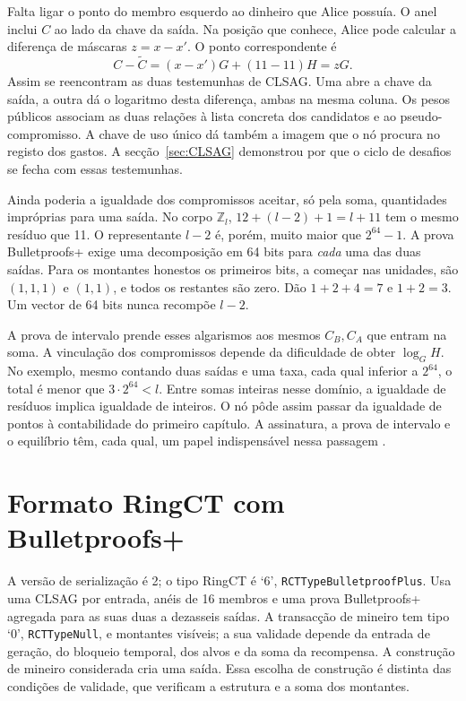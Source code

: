 Falta ligar o ponto do membro esquerdo ao dinheiro que Alice possuía.
O anel inclui \(C\) ao lado da chave da saída. Na posição que conhece,
Alice pode calcular a diferença de máscaras \(z=x-x'\). O ponto
correspondente é
\[
                 C-\widetilde C=(x-x')G+(11-11)H=zG.
\]
Assim se reencontram as duas testemunhas de CLSAG. Uma abre a chave
da saída, a outra dá o logaritmo desta diferença, ambas na mesma
coluna. Os pesos públicos associam as duas relações à lista concreta
dos candidatos e ao pseudo-compromisso. A chave de uso único dá
também a imagem que o nó procura no registo dos gastos. A
secção~\ref{sec:CLSAG} demonstrou por que o ciclo de desafios se
fecha com essas testemunhas.

Ainda poderia a igualdade dos compromissos aceitar, só pela soma,
quantidades impróprias para uma saída. No corpo \(\mathbb Z_l\),
\(12+(l-2)+1=l+11\) tem o mesmo resíduo que 11. O representante
\(l-2\) é, porém, muito maior que \(2^{64}-1\). A prova Bulletproofs+
exige uma decomposição em 64 bits para \emph{cada} uma das duas
saídas. Para os montantes honestos os primeiros bits, a começar nas
unidades, são \((1,1,1)\) e \((1,1)\), e todos os restantes são zero.
Dão \(1+2+4=7\) e \(1+2=3\). Um vector de 64 bits nunca recompõe
\(l-2\).

A prova de intervalo prende esses algarismos aos mesmos \(C_B,C_A\)
que entram na soma. A vinculação dos compromissos depende da
dificuldade de obter \(\log_G H\). No exemplo, mesmo contando duas
saídas e uma taxa, cada qual inferior a \(2^{64}\), o total é menor
que \(3\cdot2^{64}<l\). Entre somas inteiras nesse domínio, a
igualdade de resíduos implica igualdade de inteiros. O nó pôde assim
passar da igualdade de pontos à contabilidade do primeiro capítulo.
A assinatura, a prova de intervalo e o equilíbrio têm, cada qual,
um papel indispensável nessa passagem
\cite{MRL-0011-CLSAG,bulletproofs-plus-paper,monero-source-v16}.

\section{Formato RingCT com Bulletproofs+}
\label{sec:RCTTypeBulletproofPlus}

A versão de serialização é 2; o tipo RingCT é `6',
\texttt{RCTType}\allowbreak\texttt{BulletproofPlus}. Usa uma CLSAG por entrada, anéis de 16
membros e uma prova Bulletproofs+ agregada para as suas duas a dezasseis
saídas. A transacção de mineiro tem tipo `0', \texttt{RCTTypeNull}, e
montantes visíveis; a sua validade depende da entrada de geração, do
bloqueio temporal, dos alvos e da soma da recompensa. A construção de
mineiro considerada cria uma saída. Essa escolha de construção é distinta
das condições de validade, que verificam a estrutura e a soma dos montantes.

